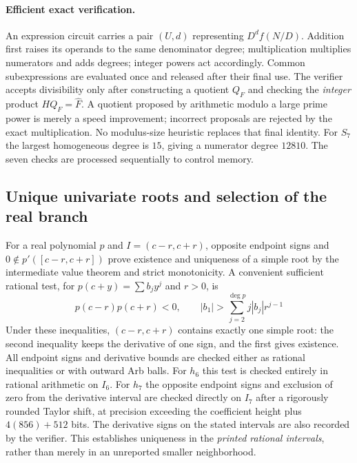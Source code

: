 \documentclass[11pt]{article}
\begin{document}
\paragraph{Efficient exact verification.}
An expression circuit carries a pair $(U,d)$ representing
$D^d f(N/D)$. Addition first raises its operands to the same denominator
degree; multiplication multiplies numerators and adds degrees; integer
powers act accordingly. Common subexpressions are evaluated once and
released after their final use. The verifier accepts divisibility only
after constructing a quotient $Q_F$ and checking the \emph{integer}
product $H Q_F=\widehat F$. A quotient proposed by arithmetic modulo a
large prime power is merely a speed improvement; incorrect proposals are
rejected by the exact multiplication. No modulus-size heuristic replaces
that final identity. For $S_7$ the largest homogeneous degree is $15$,
giving a numerator degree $12810$. The seven checks are processed
sequentially to control memory.

\subsection{Unique univariate roots and selection of the real branch}\label{sec:rootidentify}
For a real polynomial $p$ and $I=(c-r,c+r)$, opposite endpoint signs
and $0\notin p'([c-r,c+r])$ prove existence and uniqueness of a simple
root by the intermediate value theorem and strict monotonicity.
A convenient sufficient rational test, for
$p(c+y)=\sum b_jy^j$ and $r>0$, is
\begin{equation}\label{eq:Taylor-root-test}
 p(c-r)p(c+r)<0,\qquad
 |b_1|>\sum_{j=2}^{\deg p}j|b_j|r^{j-1}
\end{equation}
Under these inequalities, $(c-r,c+r)$ contains exactly one simple
root: the second inequality keeps the derivative of one sign, and
the first gives existence. All endpoint signs and derivative bounds are checked
either as rational inequalities or with outward Arb balls.
For $h_6$ this test is checked entirely in rational arithmetic on $I_6$.
For $h_7$ the opposite endpoint signs and exclusion of zero from
the derivative interval are checked directly on $I_7$ after a rigorously
rounded Taylor shift, at precision exceeding the coefficient height
plus $4(856)+512$ bits.
The derivative signs on the stated intervals are also recorded by the
verifier. This establishes uniqueness in the \emph{printed rational
intervals}, rather than merely in an unreported smaller neighborhood.
\end{document}
